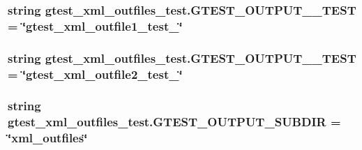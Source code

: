 \subsubsection[{\texorpdfstring{G\+T\+E\+S\+T\+\_\+\+O\+U\+T\+P\+U\+T\+\_\+1\+\_\+\+T\+E\+ST}{GTEST_OUTPUT_1_TEST}}]{\setlength{\rightskip}{0pt plus 5cm}string gtest\+\_\+xml\+\_\+outfiles\+\_\+test.\+G\+T\+E\+S\+T\+\_\+\+O\+U\+T\+P\+U\+T\+\_\+\_\+\+T\+E\+ST = \char`\"{}gtest\+\_\+xml\+\_\+outfile1\+\_\+test\+\_\+\char`\"{}}\hypertarget{namespacegtest__xml__outfiles__test_a92ab09e944d010f8abfaa3ca453fa68c}{}\label{namespacegtest__xml__outfiles__test_a92ab09e944d010f8abfaa3ca453fa68c}
\subsubsection[{\texorpdfstring{G\+T\+E\+S\+T\+\_\+\+O\+U\+T\+P\+U\+T\+\_\+2\+\_\+\+T\+E\+ST}{GTEST_OUTPUT_2_TEST}}]{\setlength{\rightskip}{0pt plus 5cm}string gtest\+\_\+xml\+\_\+outfiles\+\_\+test.\+G\+T\+E\+S\+T\+\_\+\+O\+U\+T\+P\+U\+T\+\_\+\_\+\+T\+E\+ST = \char`\"{}gtest\+\_\+xml\+\_\+outfile2\+\_\+test\+\_\+\char`\"{}}\hypertarget{namespacegtest__xml__outfiles__test_acf82219e56619aab5c114b6f0a7c3a5e}{}\label{namespacegtest__xml__outfiles__test_acf82219e56619aab5c114b6f0a7c3a5e}
\subsubsection[{\texorpdfstring{G\+T\+E\+S\+T\+\_\+\+O\+U\+T\+P\+U\+T\+\_\+\+S\+U\+B\+D\+IR}{GTEST_OUTPUT_SUBDIR}}]{\setlength{\rightskip}{0pt plus 5cm}string gtest\+\_\+xml\+\_\+outfiles\+\_\+test.\+G\+T\+E\+S\+T\+\_\+\+O\+U\+T\+P\+U\+T\+\_\+\+S\+U\+B\+D\+IR = \char`\"{}xml\+\_\+outfiles\char`\"{}}\hypertarget{namespacegtest__xml__outfiles__test_a6b3b62791305e64ec137b33bd9351b1a}{}\label{namespacegtest__xml__outfiles__test_a6b3b62791305e64ec137b33bd9351b1a}
